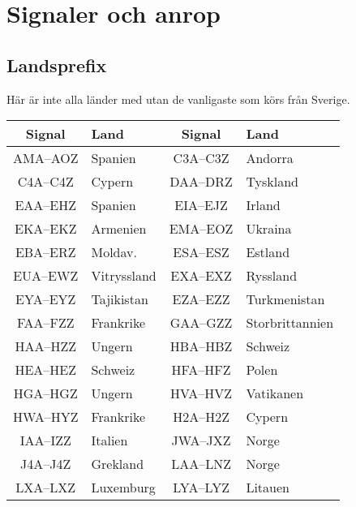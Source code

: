 \section{Signaler och anrop}
\subsection{Landsprefix}

Här är inte alla länder med utan de vanligaste som körs från Sverige.

\begin{center}
\begin{longtable}{cl|cl}
	   \textbf{Signal} & \textbf{Land}        & \textbf{Signal} & \textbf{Land}         \\ \hline
	\endhead
              AMA--AOZ     & Spanien              & C3A--C3Z        & Andorra               \\
	      C4A--C4Z     & Cypern               & DAA--DRZ        & Tyskland              \\
	      EAA--EHZ     & Spanien              & EIA--EJZ        & Irland                \\
	      EKA--EKZ     & Armenien             & EMA--EOZ        & Ukraina               \\
	      EBA--ERZ     & Moldav.              & ESA--ESZ        & Estland               \\
	      EUA--EWZ     & Vitryssland          & EXA--EXZ        & Ryssland              \\
	      EYA--EYZ     & Tajikistan           & EZA--EZZ        & Turkmenistan          \\
	      FAA--FZZ     & Frankrike            & GAA--GZZ        & Storbrittannien       \\
	      HAA--HZZ     & Ungern               & HBA--HBZ        & Schweiz               \\
	      HEA--HEZ     & Schweiz              & HFA--HFZ        & Polen                 \\
	      HGA--HGZ     & Ungern               & HVA--HVZ        & Vatikanen             \\
	      HWA--HYZ     & Frankrike            & H2A--H2Z        & Cypern                \\
	      IAA--IZZ     & Italien              & JWA--JXZ        & Norge                 \\
	      J4A--J4Z     & Grekland             & LAA--LNZ        & Norge                 \\
	      LXA--LXZ     & Luxemburg            & LYA--LYZ        & Litauen               \\

\end{longtable}
\end{center}
